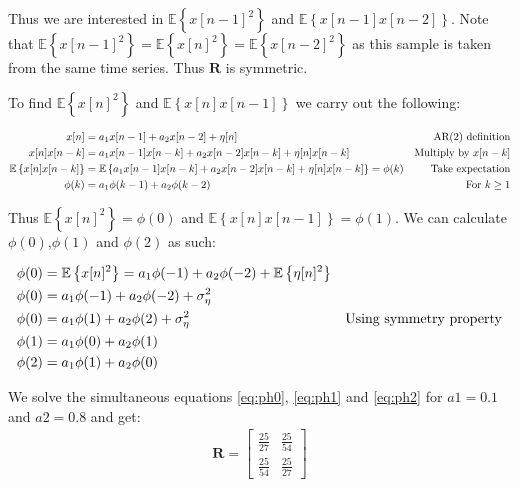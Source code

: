 \documentclass[10pt,twoside,a4paper]{report}
\begin{document}
Thus we are interested in $\mathbb{E} \left\{ x[n-1]^2 \right\}$ and $\mathbb{E} \left\{x[n-1]x[n-2] \right\}$. Note that $\mathbb{E} \left\{ x[n-1]^2 \right\} = \mathbb{E} \left\{ x[n]^2 \right\} = \mathbb{E} \left\{ x[n-2]^2 \right\}$ as this sample is taken from the same time series. Thus $\mathbf{R}$ is symmetric.

To find $\mathbb{E} \left\{ x[n]^2 \right\}$ and $\mathbb{E} \left\{x[n]x[n-1] \right\}$ we carry out the following:

\begin{align}
x[n] &= a_1 x[n-1] + a_2 x[n-2] + \eta [n] & \text{AR(2) definition} \notag \\
x[n]x[n-k] &= a_1 x[n-1]x[n-k] + a_2 x[n-2]x[n-k] + \eta [n] x[n-k] & \text{Multiply by } x[n-k] \notag \\
\mathbb{E} \left\{x[n]x[n-k] \right\}&= \mathbb{E} \left\{a_1 x[n-1]x[n-k] + a_2 x[n-2]x[n-k] + \eta [n] x[n-k] \right\} = \phi(k)& \text{Take expectation} \notag \\
\phi(k)&= a_1 \phi(k-1) + a_2 \phi(k-2)& \text{For } k \geq 1 \notag
\end{align}

Thus $\mathbb{E} \left\{ x[n]^2 \right\} = \phi(0)$ and $\mathbb{E} \left\{x[n]x[n-1] \right\} = \phi(1)$. We can calculate $\phi(0)$,$\phi(1)$ and $\phi(2)$ as such:

\begin{align}
\phi(0) &= \mathbb{E} \left\{ x[n]^2 \right\} = a_1 \phi(-1) + a_2 \phi(-2) + \mathbb{E} \left\{\eta [n] ^2 \right\} & \notag \\
\phi(0) & = a_1 \phi(-1) + a_2 \phi(-2) + \sigma_\eta ^ 2 & \notag \\
\phi(0) & = a_1 \phi(1) + a_2 \phi(2) + \sigma_\eta ^ 2 &\text{Using symmetry property} \label{eq:ph0} \\ 
\phi(1) & = a_1 \phi(0) + a_2 \phi(1) \label{eq:ph1} \\
\phi(2) & = a_1 \phi(1) + a_2 \phi(0) \label{eq:ph2}
\end{align}

We solve the simultaneous equations \ref{eq:ph0}, \ref{eq:ph1} and \ref{eq:ph2} for $a1=0.1$ and $a2=0.8$ and get:
\begin{align}
\mathbf{R} = \left[
    \begin{array}{cc}
 \frac{25}{27} & \frac{25}{54} \\[4pt]
 \frac{25}{54} &  \frac{25}{27} \end{array}
\right]
\end{align}
 
\end{document}

